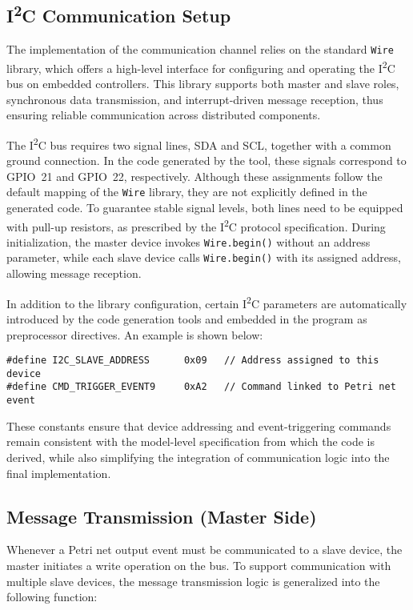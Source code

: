 \subsection{I\textsuperscript{2}C Communication Setup}
The implementation of the communication channel relies on the standard \texttt{Wire} library, which offers a high-level interface for configuring and operating the I\textsuperscript{2}C bus on embedded controllers. This library supports both master and slave roles, synchronous data transmission, and interrupt-driven message reception, thus ensuring reliable communication across distributed components.

The I\textsuperscript{2}C bus requires two signal lines, SDA and SCL, together with a common ground connection. In the code generated by the tool, these signals correspond to GPIO~21 and GPIO~22, respectively. Although these assignments follow the default mapping of the \texttt{Wire} library, they are not explicitly defined in the generated code. To guarantee stable signal levels, both lines need to be equipped with pull-up resistors, as prescribed by the I\textsuperscript{2}C protocol specification. During initialization, the master device invokes \texttt{Wire.begin()} without an address parameter, while each slave device calls \texttt{Wire.begin()} with its assigned address, allowing message reception.

In addition to the library configuration, certain I\textsuperscript{2}C parameters are automatically introduced by the code generation tools and embedded in the program as preprocessor directives. An example is shown below:
\begin{verbatim}
#define I2C_SLAVE_ADDRESS      0x09   // Address assigned to this device
#define CMD_TRIGGER_EVENT9     0xA2   // Command linked to Petri net event
\end{verbatim}
These constants ensure that device addressing and event-triggering commands remain consistent with the model-level specification from which the code is derived, while also simplifying the integration of communication logic into the final implementation.

\subsection{Message Transmission (Master Side)}
Whenever a Petri net output event must be communicated to a slave device, the master initiates a write operation on the bus. To support communication with multiple slave devices, the message transmission logic is generalized into the following function:

